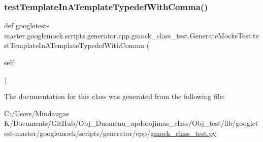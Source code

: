 \subsubsection{\texorpdfstring{testTemplateInATemplateTypedefWithComma()}{testTemplateInATemplateTypedefWithComma()}}
{\footnotesize\ttfamily def googletest-\/master.\+googlemock.\+scripts.\+generator.\+cpp.\+gmock\+\_\+class\+\_\+test.\+Generate\+Mocks\+Test.\+test\+Template\+In\+A\+Template\+Typedef\+With\+Comma (\begin{DoxyParamCaption}\item[{}]{self }\end{DoxyParamCaption})}



The documentation for this class was generated from the following file\+:\begin{DoxyCompactItemize}
\item 
C\+:/\+Users/\+Mindaugas K/\+Documents/\+Git\+Hub/\+Obj\+\_\+\+Duomenu\+\_\+apdorojimas\+\_\+class/\+Obj\+\_\+test/lib/googletest-\/master/googlemock/scripts/generator/cpp/\mbox{\hyperlink{_obj__test_2lib_2googletest-master_2googlemock_2scripts_2generator_2cpp_2gmock__class__test_8py}{gmock\+\_\+class\+\_\+test.\+py}}\end{DoxyCompactItemize}
